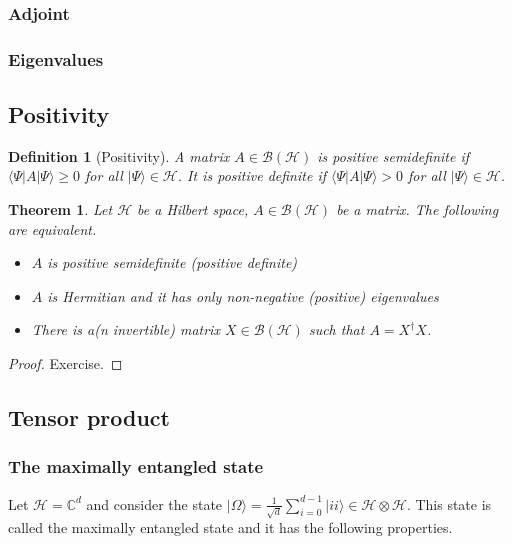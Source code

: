 \documentclass{article}
\newtheorem{theorem}{Theorem}
\newtheorem{definition}{Definition}
\theoremstyle{definition}
\newcommand{\ket}[1]{\vert #1 \rangle}
\newcommand{\bra}[1]{\langle #1 \vert}
\newcommand{\bounded}[1]{\mathcal{B}(#1)}
\begin{document}
\subsubsection{Adjoint}

\subsubsection{Eigenvalues}

\subsection{Positivity}

\begin{definition}[Positivity]
  A matrix $A\in \bounded{\mathcal{H}}$ is \emph{positive semidefinite} if $\bra{\Psi} A\ket{\Psi} \geq 0$ for all $\ket{\Psi}\in\mathcal{H}$. It is \emph{positive definite} if $\bra{\Psi} A\ket{\Psi} > 0$ for all $\ket{\Psi}\in\mathcal{H}$. 
\end{definition}

\begin{theorem}
  Let $\mathcal{H}$ be a Hilbert space, $A\in\bounded{\mathcal{H}}$ be a matrix. The following are equivalent.
  \begin{itemize}
    \item $A$ is positive semidefinite (positive definite)
    \item $A$ is Hermitian and it has only non-negative (positive) eigenvalues
    \item There is a(n invertible) matrix $X\in \bounded{\mathcal{H}}$ such that $A = X^\dagger X$.
  \end{itemize}
\end{theorem}

\begin{proof}
  Exercise.
\end{proof}

\subsection{Tensor product}

\subsubsection{The maximally entangled state}

Let $\mathcal{H} = \mathbb{C}^d$ and consider the state $\ket{\Omega} = \frac{1}{\sqrt{d}}\sum_{i=0}^{d-1} \ket{ii}\in\mathcal{H}\otimes\mathcal{H}$. This state is called the maximally entangled state and it has the following properties.
\end{document}

